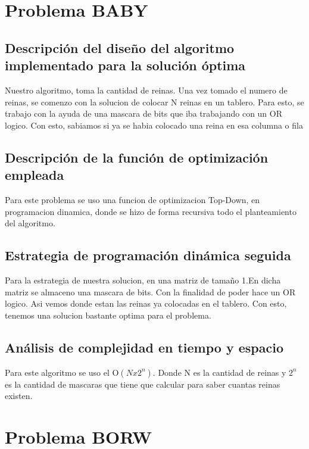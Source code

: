 \documentclass[a4paper,10pt]{article}
\begin{document}
\section{Problema BABY}

  \subsection{Descripción del diseño del algoritmo implementado para la solución óptima}
  \hspace{2cm}
  Nuestro algoritmo, toma la cantidad de reinas. Una vez tomado el numero de reinas, se comenzo con la solucion de colocar N reinas en un tablero. Para esto, se trabajo con la ayuda de una mascara de bits que iba trabajando con un OR logico. Con esto, sabiamos si ya se habia colocado una reina en esa columna o fila
  \subsection{Descripción de la función de optimización empleada}
  \hspace{2cm}
Para este problema se uso una funcion de optimizacion Top-Down, en programacion dinamica, donde se hizo de forma recursiva todo el planteamiento del algoritmo.
  \subsection{Estrategia de programación dinámica seguida}
  \hspace{2cm}
Para la estrategia de nuestra solucion, en una matriz de tamaño 1.En dicha matriz se almaceno una mascara de bits. Con la finalidad de poder hace un OR logico. Asi vemos donde estan las reinas ya colocadas en el tablero. Con esto, tenemos una solucion bastante optima para el problema.

  \subsection{Análisis de complejidad en tiempo y espacio}
  \hspace{2cm}
Para este algoritmo se uso el O${(Nx2^{n})}$. Donde N es la cantidad de reinas y $2^n$ es la cantidad de mascaras que tiene que calcular para saber cuantas reinas existen.
 



\section{Problema BORW}
\end{document}
